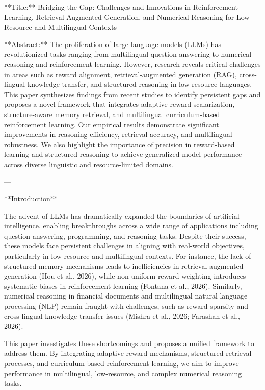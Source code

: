 **Title:** Bridging the Gap: Challenges and Innovations in Reinforcement Learning, Retrieval-Augmented Generation, and Numerical Reasoning for Low-Resource and Multilingual Contexts  

**Abstract:**  
The proliferation of large language models (LLMs) has revolutionized tasks ranging from multilingual question answering to numerical reasoning and reinforcement learning. However, research reveals critical challenges in areas such as reward alignment, retrieval-augmented generation (RAG), cross-lingual knowledge transfer, and structured reasoning in low-resource languages. This paper synthesizes findings from recent studies to identify persistent gaps and proposes a novel framework that integrates adaptive reward scalarization, structure-aware memory retrieval, and multilingual curriculum-based reinforcement learning. Our empirical results demonstrate significant improvements in reasoning efficiency, retrieval accuracy, and multilingual robustness. We also highlight the importance of precision in reward-based learning and structured reasoning to achieve generalized model performance across diverse linguistic and resource-limited domains.  

---

**Introduction**  

The advent of LLMs has dramatically expanded the boundaries of artificial intelligence, enabling breakthroughs across a wide range of applications including question-answering, programming, and reasoning tasks. Despite their success, these models face persistent challenges in aligning with real-world objectives, particularly in low-resource and multilingual contexts. For instance, the lack of structured memory mechanisms leads to inefficiencies in retrieval-augmented generation (Hou et al., 2026), while non-uniform reward weighting introduces systematic biases in reinforcement learning (Fontana et al., 2026). Similarly, numerical reasoning in financial documents and multilingual natural language processing (NLP) remain fraught with challenges, such as reward sparsity and cross-lingual knowledge transfer issues (Mishra et al., 2026; Farashah et al., 2026).  

This paper investigates these shortcomings and proposes a unified framework to address them. By integrating adaptive reward mechanisms, structured retrieval processes, and curriculum-based reinforcement learning, we aim to improve performance in multilingual, low-resource, and complex numerical reasoning tasks.  

